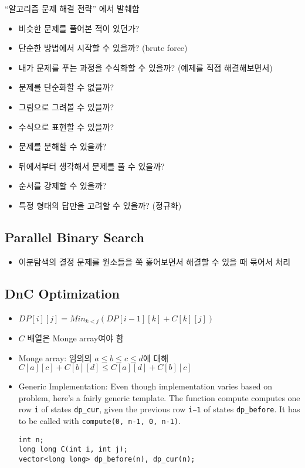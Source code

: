 {``알고리즘 문제 해결 전략'' 에서 발췌함
\begin{itemize}
\item 비슷한 문제를 풀어본 적이 있던가?
\item 단순한 방법에서 시작할 수 있을까? (brute force)
\item 내가 문제를 푸는 과정을 수식화할 수 있을까? (예제를 직접 해결해보면서)
\item 문제를 단순화할 수 없을까?
\item 그림으로 그려볼 수 있을까?
\item 수식으로 표현할 수 있을까?
\item 문제를 분해할 수 있을까?
\item 뒤에서부터 생각해서 문제를 풀 수 있을까?
\item 순서를 강제할 수 있을까?
\item 특정 형태의 답만을 고려할 수 있을까? (정규화)
\end{itemize}

\subsection{Parallel Binary Search}
\begin{itemize}
    \item 이분탐색의 결정 문제를 원소들을 쭉 훑어보면서 해결할 수 있을 때 묶어서 처리
\end{itemize}

\subsection{DnC Optimization}
\begin{itemize}
    \item $DP[i][j] = Min_{k < j}(DP[i-1][k] + C[k][j])$
    \item $C$ 배열은 Monge array여야 함
    \item Monge array: 임의의 $a \le b \le c \le d$에 대해 $C[a][c] + C[b][d] \le C[a][d] + C[b][c]$
    \item Generic Implementation: Even though implementation varies based on problem, here's a fairly generic template. The function compute computes one row \texttt{i} of states \texttt{dp\_cur}, given the previous row \texttt{i−1} of states \texttt{dp\_before}. It has to be called with \texttt{compute(0, n-1, 0, n-1)}.
    \begin{verbatim}
int n;
long long C(int i, int j);
vector<long long> dp_before(n), dp_cur(n);


\end{verbatim}
\end{itemize}}
